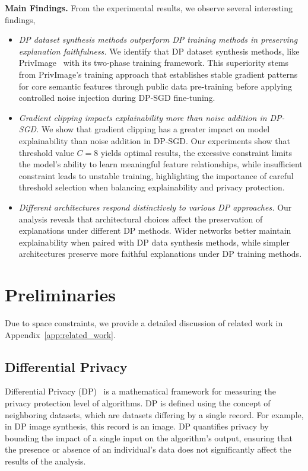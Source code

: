 \documentclass{article}
\begin{document}
\noindent \textbf{Main Findings. } From the experimental results, we observe several interesting findings,
\begin{itemize}[leftmargin=*]
    \item \textit{DP dataset synthesis methods outperform DP training methods in preserving explanation faithfulness.} We identify that DP dataset synthesis methods, like PrivImage~\cite{li2023meticulously} with its two-phase training framework. This superiority stems from PrivImage's training approach that establishes stable gradient patterns for core semantic features through public data pre-training before applying controlled noise injection during DP-SGD fine-tuning.
    
    \item \textit{Gradient clipping impacts explainability more than noise addition in DP-SGD.} We show that gradient clipping has a greater impact on model explainability than noise addition in DP-SGD. Our experiments show that threshold value $C = 8$ yields optimal results, the excessive constraint limits the model's ability to learn meaningful feature relationships, while insufficient constraint leads to unstable training, highlighting the importance of careful threshold selection when balancing explainability and privacy protection.

    \item \textit{Different architectures respond distinctively to various DP approaches.} Our analysis reveals that architectural choices affect the preservation of explanations under different DP methods. Wider networks better maintain explainability when paired with DP data synthesis methods, while simpler architectures preserve more faithful explanations under DP training methods. 
    
\end{itemize}

\section{Preliminaries}

Due to space constraints, we provide a detailed discussion of related work in Appendix~\ref{app:related_work}.
\subsection{Differential Privacy}

Differential Privacy (DP)~\cite{dwork2008differential} is a mathematical framework for measuring the privacy protection level of algorithms. DP is defined using the concept of neighboring datasets, which are datasets differing by a single record. For example, in DP image synthesis, this record is an image. DP quantifies privacy by bounding the impact of a single input on the algorithm's output, ensuring that the presence or absence of an individual's data does not significantly affect the results of the analysis.
\end{document}

